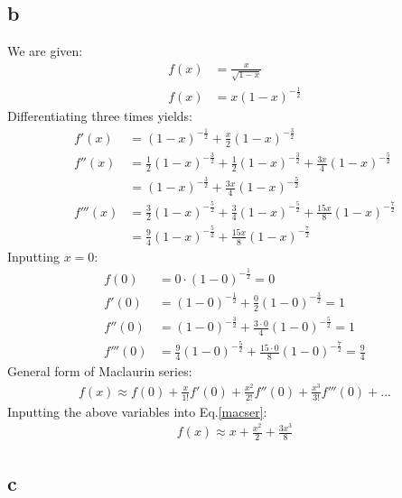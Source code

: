 \documentclass[11pt]{article}
\numberwithin{equation}{section}
\begin{document}
\subsection*{b}
We are given:
\begin{align}
	f(x) &= \frac{x}{\sqrt{1-x}}\\
	f(x) &= x\left( 1 - x \right)^{-\frac{1}{2}}
\end{align}
Differentiating three times yields:
\begin{align}
	f'(x) &= \left(1 - x \right)^{-\frac{1}{2}} + \frac{x}{2} \left( 1-x\right)^{-\frac{3}{2}}\\
	f''(x) &= \frac{1}{2} \left( 1- x\right)^{-\frac{3}{2}} + \frac{1}{2} \left( 1- x\right)^{-\frac{3}{2}} + \frac{3x}{4} \left( 1-x \right)^{-\frac{5}{2}}\\
	&= \left( 1-x \right)^{-\frac{3}{2}} + \frac{3x}{4} \left( 1-x \right)^{-\frac{5}{2}} \\
	f'''(x) &= \frac{3}{2} \left( 1-x \right)^{-\frac{5}{2}} + \frac{3}{4} \left( 1-x \right)^{-\frac{5}{2}} + \frac{15x}{8} \left( 1-x \right)^{-\frac{7}{2}}\\
	&= \frac{9}{4} \left( 1-x \right)^{-\frac{5}{2}} + \frac{15x}{8} \left( 1-x \right)^{-\frac{7}{2}}
\end{align}
Inputting $x=0$:
\begin{align}
	f(0) &= 0 \cdot \left( 1 - 0 \right)^{-\frac{1}{2}} = 0\\
	f'(0) &= \left(1 - 0 \right)^{-\frac{1}{2}} + \frac{0}{2} \left( 1-0\right)^{-\frac{3}{2}} = 1\\
	f''(0) &= \left( 1-0 \right)^{-\frac{3}{2}} + \frac{3\cdot 0}{4} \left( 1-0 \right)^{-\frac{5}{2}} = 1\\
	f'''(0) &= \frac{9}{4} \left( 1-0 \right)^{-\frac{5}{2}} + \frac{15 \cdot 0}{8} \left( 1-0 \right)^{-\frac{7}{2}} = \frac{9}{4}
\end{align}
General form of Maclaurin series:
\begin{align}
	f(x) \approx f(0) + \frac{x}{1!}f'(0) + \frac{x^2}{2!}f''(0) + \frac{x^3}{3!}f'''(0) + ... \label{macser}
\end{align}
Inputting the above variables into Eq.\ref{macser}:
\begin{align}
	f(x) \approx x + \frac{x^2}{2} + \frac{3x^3}{8}	
\end{align}
\subsection*{c}
\end{document}
